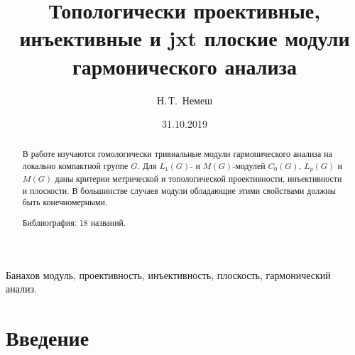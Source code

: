 \documentclass{article}
\numberwithin{equation}{section}
\theoremstyle{plain}
\theoremstyle{definition}
\begin{document}
\title{
    Топологически проективные, инъективные и jxt 
    плоские модули гармонического анализа
}
\author[N.\,T.~Nemesh]{Н.\,Т.~Немеш}
\address{Московский государственный университет им.~М.\,В.~Ломоносова}

\date{31.10.2019}

\maketitle

\begin{fulltext}

\begin{abstract} В работе изучаются гомологически тривиальные модули 
гармонического анализа на локально компактной группе $G$. Для $L_1(G)$- и 
$M(G)$-модулей $C_0(G)$, $L_p(G)$ и $M(G)$ даны критерии метрической и 
топологической проективности, инъективности и плоскости. В большинстве случаев 
модули обладающие этими свойствами должны быть конечномерными.

Библиография: 18 названий.
\end{abstract}

\begin{keywords} 
Банахов модуль, проективность, инъективность, плоскость, гармонический анализ.
\end{keywords}




\section{Введение}\label{SectionIntroduction}


\end{fulltext}
\end{document}
